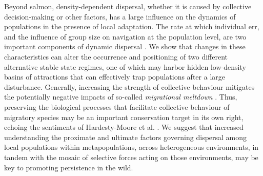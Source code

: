 \documentclass{revtex4}
\begin{document}
Beyond salmon, density-dependent dispersal, whether it is caused by collective decision-making or other factors, has a large influence on the dynamics of populations in the presence of local adaptation.
The rate at which individual err, and the influence of group size on navigation at the population level, are two important components of dynamic dispersal \citep{Berdahl:2016dx}.
We show that changes in these characteristics can alter the occurrence and positioning of two different alternative stable state regimes, one of which may harbor hidden low-density basins of attractions that can effectively trap populations after a large disturbance.
Generally, increasing the strength of collective behaviour mitigates the potentially negative impacts of so-called \emph{migrational meltdown} \citep{Ronce:2001dp}.
Thus, preserving the biological processes that facilitate collective behaviour of migratory species may be an important conservation target in its own right, echoing the sentiments of Hardesty-Moore et al. \citep{HardestyMoore:wg}. 
We suggest that increased understanding the proximate and ultimate factors governing dispersal among local populations within metapopulations, across heterogeneous environments, in tandem with the mosaic of selective forces acting on those environments, may be key to promoting persistence in the wild.
\\ \\
\end{document}
